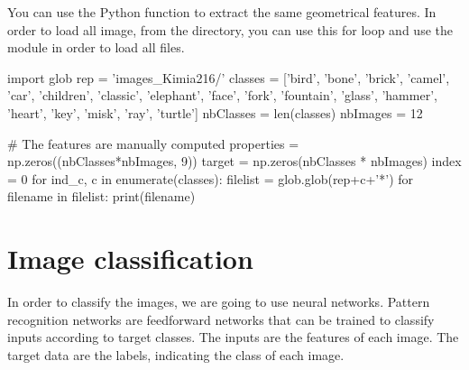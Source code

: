 \begin{pcomment}
\begin{premark}
You can use the Python function  to extract the same geometrical features. In order to load all image, from the directory, you can use this for loop and use the  module in order to load all files.

\begin{python}
import glob
rep = 'images_Kimia216/'
classes = ['bird', 'bone', 'brick', 'camel', 'car', 'children',
           'classic', 'elephant', 'face', 'fork', 'fountain',
           'glass', 'hammer', 'heart', 'key', 'misk', 'ray', 'turtle']
nbClasses = len(classes)
nbImages = 12

# The features are manually computed
properties = np.zeros((nbClasses*nbImages, 9))
target = np.zeros(nbClasses * nbImages)
index = 0
for ind_c, c in enumerate(classes):
    filelist = glob.glob(rep+c+'*')
    for filename in filelist:
        print(filename)
\end{python}

\end{premark}
\end{pcomment}




\section{Image classification}
In order to classify the images, we are going to use neural networks. Pattern recognition networks are feedforward networks that can be trained to classify inputs according to target classes.
The inputs are the features of each image. The target data are the labels, indicating the class of each image.


